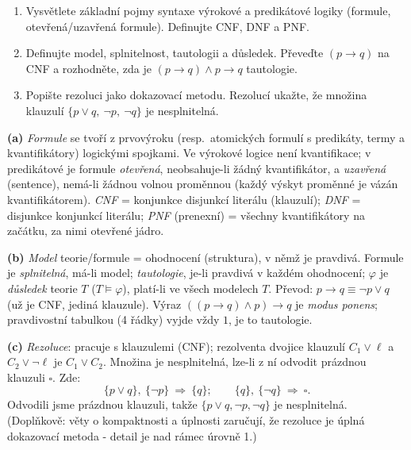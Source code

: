 \begin{zadani}
\begin{enumerate}[label=(\alph*)]
  \item {} Vysvětlete základní pojmy syntaxe výrokové a predikátové logiky (formule, otevřená/uzavřená formule). Definujte CNF, DNF a PNF.
  \item {} Definujte model, splnitelnost, tautologii a důsledek. Převeďte $(p\to q)$ na CNF a rozhodněte, zda je $(p\to q)\wedge p\to q$ tautologie.
  \item {} Popište rezoluci jako dokazovací metodu. Rezolucí ukažte, že množina klauzulí $\{p\vee q,\ \neg p,\ \neg q\}$ je nesplnitelná.
\end{enumerate}
\end{zadani}

\begin{reseni}
\textbf{(a)} \emph{Formule} se tvoří z prvovýroku (resp.\ atomických formulí s predikáty, termy a kvantifikátory) logickými spojkami. Ve výrokové logice není kvantifikace; v predikátové je formule \emph{otevřená}, neobsahuje-li žádný kvantifikátor, a \emph{uzavřená} (sentence), nemá-li žádnou volnou proměnnou (každý výskyt proměnné je vázán kvantifikátorem). \emph{CNF} = konjunkce disjunkcí literálu (klauzulí); \emph{DNF} = disjunkce konjunkcí literálu; \emph{PNF} (prenexní) = všechny kvantifikátory na začátku, za nimi otevřené jádro.

\textbf{(b)} \emph{Model} teorie/formule = ohodnocení (struktura), v němž je pravdivá. Formule je \emph{splnitelná}, má-li model; \emph{tautologie}, je-li pravdivá v každém ohodnocení; $\varphi$ je \emph{důsledek} teorie $T$ ($T\models\varphi$), platí-li ve všech modelech $T$. Převod: $p\to q\equiv\neg p\vee q$ (už je CNF, jediná klauzule). Výraz $((p\to q)\wedge p)\to q$ je \emph{modus ponens}; pravdivostní tabulkou (4 řádky) vyjde vždy $1$, je to tautologie.

\textbf{(c)} \emph{Rezoluce}: pracuje s klauzulemi (CNF); rezolventa dvojice klauzulí $C_1\vee\ell$ a $C_2\vee\neg\ell$ je $C_1\vee C_2$. Množina je nesplnitelná, lze-li z ní odvodit prázdnou klauzuli $\square$. Zde:
\[
\{p\vee q\},\ \{\neg p\}\ \Rightarrow\ \{q\};\qquad \{q\},\ \{\neg q\}\ \Rightarrow\ \square.
\]
Odvodili jsme prázdnou klauzuli, takže $\{p\vee q,\neg p,\neg q\}$ je nesplnitelná. (Doplňkově: věty o kompaktnosti a úplnosti zaručují, že rezoluce je úplná dokazovací metoda - detail je nad rámec úrovně 1.)
\end{reseni}

